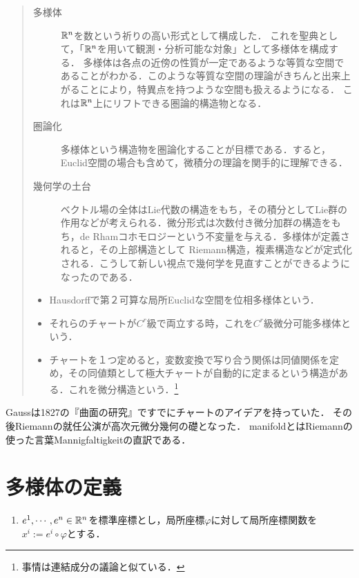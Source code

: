 \documentclass[uplatex,dvipdfmx]{jsreport}
\begin{document}
\begin{quotation}
    \begin{description}
        \item[多様体] $\mathbb{R}^n$を数という祈りの高い形式として構成した．
        これを聖典として，「$\mathbb{R}^n$を用いて観測・分析可能な対象」として多様体を構成する．
        多様体は各点の近傍の性質が一定であるような等質な空間であることがわかる．このような等質な空間の理論がきちんと出来上がることにより，特異点を持つような空間も扱えるようになる．\cite{坪井}
        これは$\mathbb{R}^n$上にリフトできる圏論的構造物となる．
        \item[圏論化] 多様体という構造物を圏論化することが目標である．すると，Euclid空間の場合も含めて，微積分の理論を関手的に理解できる．
        \item[幾何学の土台] ベクトル場の全体はLie代数の構造をもち，その積分としてLie群の作用などが考えられる．微分形式は次数付き微分加群の構造をもち，de Rhamコホモロジーという不変量を与える．多様体が定義されると，その上部構造として
        Riemann構造，複素構造などが定式化される．こうして新しい視点で幾何学を見直すことができるようになったのである．
    \end{description}
    \begin{itemize}
        \item Hausdorffで第２可算な局所Euclidな空間を位相多様体という．
        \item それらのチャートが$C^r$級で両立する時，これを$C^r$級微分可能多様体という．
        \item チャートを１つ定めると，変数変換で写り合う関係は同値関係を定め，その同値類として極大チャートが自動的に定まるという構造がある．これを微分構造という．\footnote{事情は連結成分の議論と似ている．}
    \end{itemize}
\end{quotation}

\begin{history}
    Gaussは1827の『曲面の研究』ですでにチャートのアイデアを持っていた．
    その後Riemannの就任公演が高次元微分幾何の礎となった．
    manifoldとはRiemannの使った言葉Mannigfaltigkeitの直訳である．
\end{history}

\section{多様体の定義}

\begin{notation}\mbox{}
    \begin{enumerate}
        \item $e^1,\cdots,e^n\in\mathbb{R}^n$を標準座標とし，局所座標$\varphi$に対して局所座標関数を$x^i:=e^i\circ\varphi$とする．
    \end{enumerate}
\end{notation}
\end{document}
